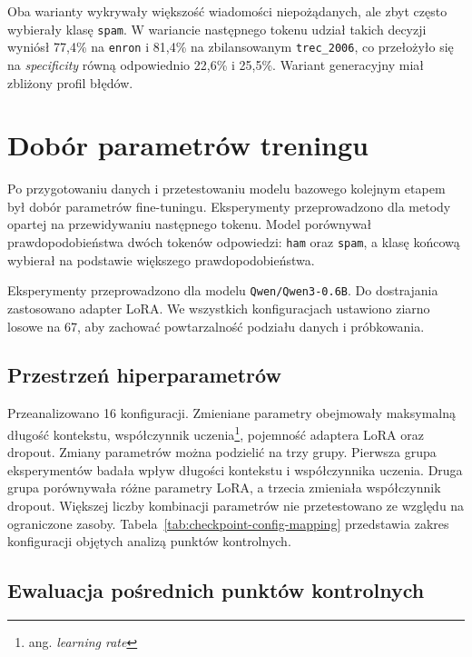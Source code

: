 Oba warianty wykrywały większość wiadomości niepożądanych, ale zbyt często
wybierały klasę \texttt{spam}. W wariancie następnego tokenu udział takich
decyzji wyniósł 77,4\% na \texttt{enron} i 81,4\% na zbilansowanym
\texttt{trec\_2006}, co przełożyło się na \emph{specificity} równą odpowiednio
22,6\% i 25,5\%. Wariant generacyjny miał zbliżony profil błędów.

\section{Dobór parametrów treningu}

Po przygotowaniu danych i przetestowaniu modelu bazowego kolejnym etapem był
dobór parametrów fine-tuningu. Eksperymenty przeprowadzono dla metody opartej na przewidywaniu
następnego tokenu. Model porównywał prawdopodobieństwa dwóch tokenów odpowiedzi:
\texttt{ham} oraz \texttt{spam}, a klasę końcową wybierał na podstawie
większego prawdopodobieństwa.

Eksperymenty przeprowadzono dla modelu \texttt{Qwen/Qwen3-0.6B}. Do
dostrajania zastosowano adapter LoRA. We wszystkich konfiguracjach ustawiono
ziarno losowe na 67, aby zachować powtarzalność podziału danych i próbkowania.

\subsection{Przestrzeń hiperparametrów}

Przeanalizowano 16 konfiguracji. Zmieniane parametry obejmowały maksymalną
długość kontekstu, współczynnik uczenia\footnote{ang. \emph{learning rate}},
pojemność adaptera LoRA oraz dropout. Zmiany parametrów można podzielić na trzy
grupy. Pierwsza grupa eksperymentów badała wpływ długości kontekstu i
współczynnika uczenia. Druga grupa porównywała różne parametry LoRA, a
trzecia zmieniała współczynnik dropout.
Większej liczby kombinacji parametrów nie przetestowano ze względu na ograniczone zasoby.
Tabela~\ref{tab:checkpoint-config-mapping} przedstawia zakres konfiguracji objętych analizą punktów kontrolnych.

\begin{table}[htbp]
\centering
\small

\caption{Konfiguracje treningu objęte analizą punktów kontrolnych.}
\label{tab:checkpoint-config-mapping}
\end{table}

\subsection{Ewaluacja pośrednich punktów kontrolnych}

